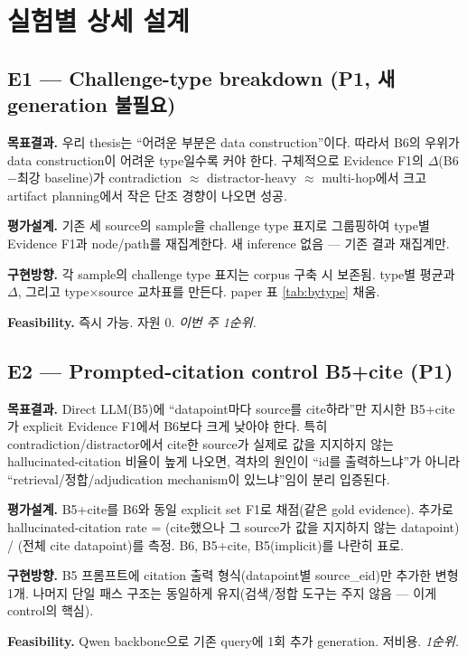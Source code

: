 \documentclass[11pt]{article}
\begin{document}
\section{실험별 상세 설계}

\subsection{E1 — Challenge-type breakdown (P1, 새 generation 불필요)}

\textbf{목표결과.} 우리 thesis는 ``어려운 부분은 data construction''이다. 따라서 B6의 우위가
data construction이 어려운 type일수록 커야 한다. 구체적으로 Evidence F1의 $\Delta$(B6$-$최강
baseline)가 contradiction $\approx$ distractor-heavy $\approx$ multi-hop에서 크고 artifact
planning에서 작은 단조 경향이 나오면 성공.

\textbf{평가설계.} 기존 세 source의 sample을 challenge type 표지로 그룹핑하여 type별 Evidence
F1과 node/path를 재집계한다. 새 inference 없음 — 기존 결과 재집계만.

\textbf{구현방향.} 각 sample의 challenge type 표지는 corpus 구축 시 보존됨. type별 평균과
$\Delta$, 그리고 type$\times$source 교차표를 만든다. paper 표 \ref{tab:bytype} 채움.

\textbf{Feasibility.} 즉시 가능. 자원 0. \emph{이번 주 1순위.}

\subsection{E2 — Prompted-citation control B5+cite (P1)}

\textbf{목표결과.} Direct LLM(B5)에 ``datapoint마다 source를 cite하라''만 지시한 B5+cite가
explicit Evidence F1에서 B6보다 크게 낮아야 한다. 특히 contradiction/distractor에서 cite한
source가 실제로 값을 지지하지 않는 hallucinated-citation 비율이 높게 나오면, 격차의 원인이 ``id를
출력하느냐''가 아니라 ``retrieval/정합/adjudication mechanism이 있느냐''임이 분리 입증된다.

\textbf{평가설계.} B5+cite를 B6와 동일 explicit set F1로 채점(같은 gold evidence). 추가로
hallucinated-citation rate = (cite했으나 그 source가 값을 지지하지 않는 datapoint) / (전체 cite
datapoint)를 측정. B6, B5+cite, B5(implicit)를 나란히 표로.

\textbf{구현방향.} B5 프롬프트에 citation 출력 형식(datapoint별 source\_eid)만 추가한 변형 1개.
나머지 단일 패스 구조는 동일하게 유지(검색/정합 도구는 주지 않음 — 이게 control의 핵심).

\textbf{Feasibility.} Qwen backbone으로 기존 query에 1회 추가 generation. 저비용. \emph{1순위.}
\end{document}
